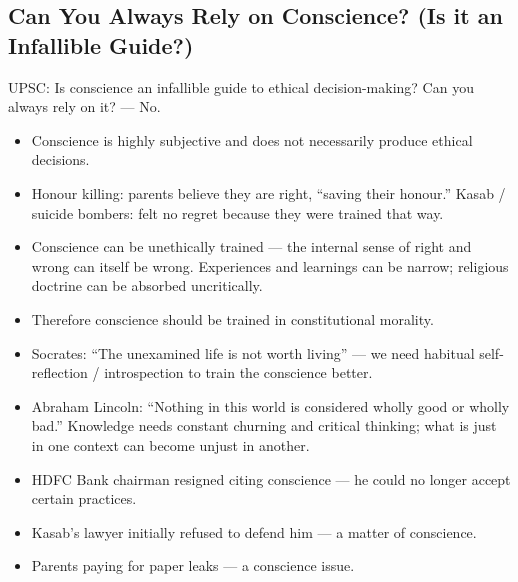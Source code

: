 \subsection{Can You Always Rely on Conscience? (Is it an Infallible Guide?)}
\begin{PYQLink}
UPSC: Is conscience an infallible guide to ethical decision-making? Can you always rely on it? --- No.
\end{PYQLink}

\begin{CriticalPoint}
\begin{itemize}
\item Conscience is highly subjective and does not necessarily produce ethical decisions.
\item Honour killing: parents believe they are right, ``saving their honour.'' Kasab / suicide bombers: felt no regret because they were trained that way.
\item Conscience can be unethically trained --- the internal sense of right and wrong can itself be wrong. Experiences and learnings can be narrow; religious doctrine can be absorbed uncritically.
\end{itemize}
\end{CriticalPoint}

\begin{KeyConcept}
\begin{itemize}
\item Therefore conscience should be trained in constitutional morality.
\item Socrates: ``The unexamined life is not worth living'' --- we need habitual self-reflection / introspection to train the conscience better.
\item Abraham Lincoln: ``Nothing in this world is considered wholly good or wholly bad.'' Knowledge needs constant churning and critical thinking; what is just in one context can become unjust in another.
\end{itemize}
\end{KeyConcept}

\begin{ExampleBox}
\begin{itemize}
\item HDFC Bank chairman resigned citing conscience --- he could no longer accept certain practices.
\item Kasab's lawyer initially refused to defend him --- a matter of conscience.
\item Parents paying for paper leaks --- a conscience issue.
\end{itemize}
\end{ExampleBox}


